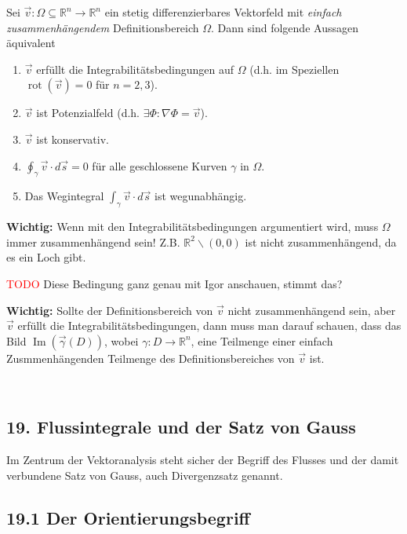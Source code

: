 \documentclass[a4paper,landscape,8pt]{extarticle}
\newcommand{\R}{\mathbb{R}}
\renewcommand\Im{\operatorname{Im}}
\newcommand{\todo}{\textcolor{red}{TODO }}
\newcommand{\Wichtig}{\textbf{Wichtig: }}
\DeclareMathOperator{\rot}{rot}
\renewcommand*{\newpage}{ \ }
\begin{document}
\begin{multicols*}{4}
Sei $\vec{v}\colon\Omega\subseteq\R^n\to\R^n$ ein stetig differenzierbares
Vektorfeld mit \emph{einfach zusammenhängendem} Definitionsbereich $\Omega$.
Dann sind folgende Aussagen äquivalent
\begin{enumerate}[label=(\arabic*)]
  \item $\vec{v}$ erfüllt die Integrabilitätsbedingungen auf $\Omega$ (d.h.
  im Speziellen $\rot(\vec{v})=0$ für $n=2,3$).
  \item $\vec{v}$ ist Potenzialfeld (d.h. $\exists \Phi \colon \nabla\Phi=
  \vec{v}$).
  \item $\vec{v}$ ist konservativ.
  \item $\oint_\gamma \vec{v}\cdot d\vec{s}=0$ für alle geschlossene Kurven
  $\gamma$ in $\Omega$.
  \item Das Wegintegral $\int_\gamma\vec{v}\cdot d\vec{s}$ ist wegunabhängig.
\end{enumerate}

\Wichtig Wenn mit den Integrabilitätsbedingungen argumentiert wird, muss
$\Omega$ immer zusammenhängend sein! Z.B. $\R^2\backslash(0,0)$ ist nicht
zusammenhängend, da es ein Loch gibt.

\begin{warmup}
\todo Diese Bedingung ganz genau mit Igor anschauen, stimmt das?
\end{warmup}

\Wichtig Sollte der Definitionsbereich von $\vec{v}$ nicht zusammenhängend sein,
aber $\vec{v}$ erfüllt die Integrabilitätsbedingungen, dann muss man darauf
schauen, dass das Bild $\Im(\vec{\gamma}(D))$, wobei $\gamma\colon D\to \R^n$,
eine Teilmenge einer einfach Zusmmenhängenden Teilmenge des Definitionsbereiches
von $\vec{v}$ ist.

\newpage

\begin{warmup}

\section{19. Flussintegrale und der Satz von Gauss}

Im Zentrum der Vektoranalysis steht sicher der Begriff des Flusses und der damit
verbundene Satz von Gauss, auch Divergenzsatz genannt.

\subsection{19.1 Der Orientierungsbegriff}
\newpage


\end{warmup}
\end{multicols*}
\end{document}

